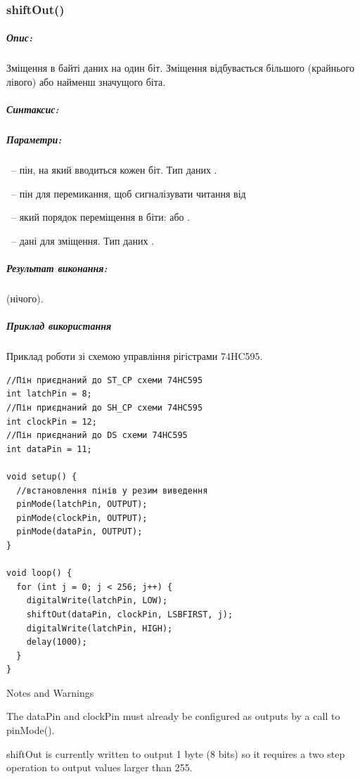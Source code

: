\documentclass[12pt,a4paper]{report}  %
\begin{document}
\subsubsection{shiftOut()}\label{shiftOut}

\subparagraph{Опис:}

Зміщення в байті даних на один біт. Зміщення відбувається більшого (крайнього лівого) або найменш значущого біта.

\subparagraph{Синтаксис:}


\subparagraph{Параметри:}

~-- пін, на який вводиться кожен біт.  Тип даних .

~-- пін для перемикання, щоб сигналізувати читання від 

~-- який порядок переміщення в біти:  або .

~-- дані для зміщення. Тип даних .

\subparagraph{Результат виконання:} 

 (нічого).

\subparagraph{Приклад використання}

Приклад роботи зі схемою управління рігістрами 74HC595.

\begin{lstlisting}[label=digitalwrite,caption=shiftOut]
//Пін приєднаний до ST_CP схеми 74HC595
int latchPin = 8;
//Пін приєднаний до SH_CP схеми 74HC595
int clockPin = 12;
//Пін приєднаний до DS схеми 74HC595
int dataPin = 11;

void setup() {
  //встановлення пінів у резим виведення
  pinMode(latchPin, OUTPUT);
  pinMode(clockPin, OUTPUT);
  pinMode(dataPin, OUTPUT);
}

void loop() {
  for (int j = 0; j < 256; j++) {
    digitalWrite(latchPin, LOW);
    shiftOut(dataPin, clockPin, LSBFIRST, j);
    digitalWrite(latchPin, HIGH);
    delay(1000);
  }
}
\end{lstlisting}

Notes and Warnings

The dataPin and clockPin must already be configured as outputs by a call to pinMode().

shiftOut is currently written to output 1 byte (8 bits) so it requires a two step operation to output values larger than 255.
\end{document}
